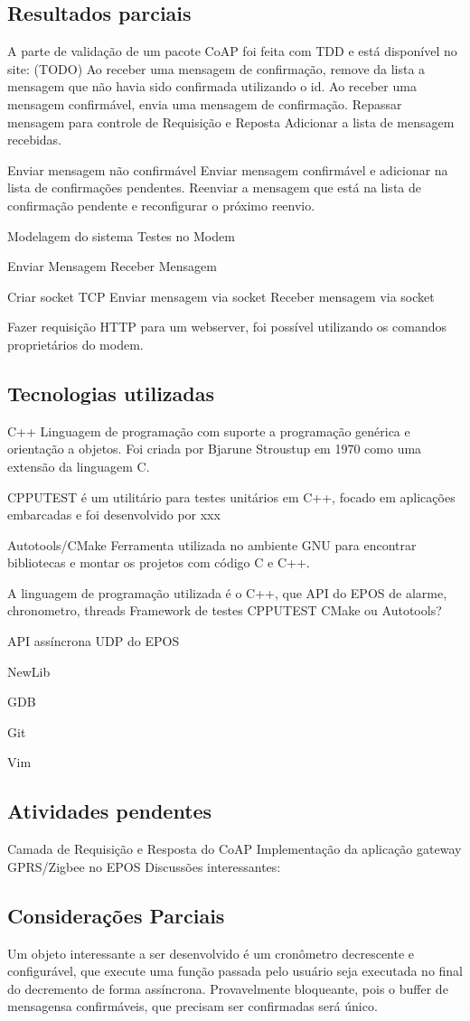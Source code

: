 \subsection{Resultados parciais}
A parte de validação de um pacote CoAP foi feita com TDD e est\'a dispon\'ivel no site: (TODO)
Ao receber uma mensagem de confirmação, remove da lista a mensagem que não havia sido confirmada utilizando o id.
Ao receber uma mensagem confirm\'avel, envia uma mensagem de confirmação.
Repassar mensagem para controle de Requisição e Reposta Adicionar a lista de mensagem recebidas.

Enviar mensagem não confirm\'avel
Enviar mensagem confirm\'avel e adicionar na lista de confirmaç\~oes pendentes.
Reenviar a mensagem que est\'a na lista de confirmação pendente e reconfigurar o pr\'oximo reenvio.

Modelagem do sistema
Testes no Modem

Enviar Mensagem
Receber Mensagem

Criar socket TCP
Enviar mensagem via socket
Receber mensagem via socket

Fazer requisição HTTP para um webserver, foi poss\'ivel utilizando os comandos propriet\'arios do modem.


\subsection{Tecnologias utilizadas}
C++
Linguagem de programação com suporte a programação gen\'erica e orientação a objetos. Foi criada por Bjarune Stroustup em 1970 como uma extensão da linguagem C.

CPPUTEST
\'e um utilit\'ario para testes unit\'arios em C++, focado em aplicaç\~oes embarcadas e foi desenvolvido por xxx

Autotools/CMake
Ferramenta utilizada no ambiente GNU para encontrar bibliotecas e montar os projetos com c\'odigo C e C++.

A linguagem de programação utilizada \'e o C++, que API do EPOS de alarme, chronometro, threads
Framework de testes CPPUTEST CMake ou Autotools?

API ass\'incrona UDP do EPOS

NewLib

GDB

Git

Vim

\subsection{Atividades pendentes}
Camada de Requisição e Resposta do CoAP
Implementação da aplicação gateway GPRS/Zigbee no EPOS
Discuss\~oes interessantes:


\subsection{Consideraç\~oes Parciais}
Um objeto interessante a ser desenvolvido \'e um cronômetro decrescente e configur\'avel, que execute uma função passada pelo usu\'ario seja executada no final do decremento de forma ass\'incrona. Provavelmente bloqueante, pois o buffer de mensagensa confirm\'aveis, que precisam ser confirmadas ser\'a único.
